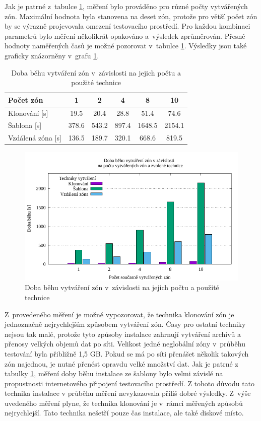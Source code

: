 Jak je patrné z~tabulce \ref{table:measuremet:creation_table}, měření bylo prováděno pro různé počty vytvářených zón. Maximální
hodnota byla stanovena na deset zón, protože pro větší počet zón by se výrazně projevovala omezení testovacího prostředí. Pro každou
kombinaci parametrů bylo měření několikrát opakováno a~výsledek zprůměrován. Přesné hodnoty naměřených časů je možné pozorovat v~tabulce
\ref{table:measuremet:creation_table}. Výsledky jsou také graficky znázorněny v~grafu \ref{graph:measuremet:creation_graph}.
\begin{table}[b]
  \centering
  \caption{Doba běhu vytváření zón v~závislosti na jejich počtu a použité technice}
  \begin{tabular}{ l | c c c c c}
   Počet zón & 1 & 2 & 4 & 8 & 10 \\ \hline
   Klonování [s] & 19.5 & 20.4 & 28.8 & 51.4 & 74.6 \\
   Šablona [s] & 378.6 & 543.2 & 897.4 & 1648.5 & 2154.1 \\
   Vzdálená zóna [s] & 136.5 & 189.7 & 320.1 & 668.6 & 819.5 \\
  \end{tabular}
  \label{table:measuremet:creation_table}
\end{table}

\begin{figure}
  \centering
  \includegraphics{assets/pdfs/measurement_creation.pdf}
  \caption{Doba běhu vytváření zón v~závislosti na jejich počtu a použité technice}
  \label{graph:measuremet:creation_graph}
\end{figure}

Z~provedeného měření je možné vypozorovat, že technika klonování zón je jednoznačně nejrychlejším způsobem vytváření zón. Časy
pro ostatní techniky nejsou tak malé, protože tyto způsoby instalace zahrnují vytváření archivů a přenosy velkých objemů dat
po síti. Velikost jedné neglobální zóny v~průběhu testování byla přibližně 1,5 GB. Pokud se má po síti přenášet několik takových
zón najednou, je nutné přenést opravdu velké množství dat. Jak je patrné z tabulky \ref{table:measuremet:creation_table}, měření
doby běhu instalace ze šablony bylo velmi závislé na propustnosti internetového připojení testovacího prostředí. Z tohoto důvodu
tato technika instalace v průběhu měření nevykazovala příliš dobré výsledky. Z~výše uvedeného měření plyne, že technika klonování
je v~rámci měřených způsobů nejrychlejší. Tato technika nešetří pouze čas instalace, ale také diskové místo.
